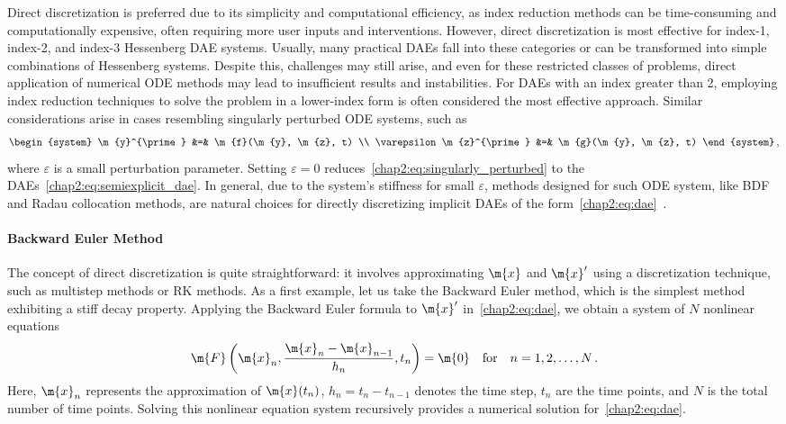 Direct discretization is preferred due to its simplicity and computational efficiency, as index reduction methods can be time-consuming and computationally expensive, often requiring more user inputs and interventions. However, direct discretization is most effective for index-1, index-2, and index-3 Hessenberg \ac{DAE} systems. Usually, many practical \acp{DAE} fall into these categories or can be transformed into simple combinations of Hessenberg systems. Despite this, challenges may still arise, and even for these restricted classes of problems, direct application of numerical \ac{ODE} methods may lead to insufficient results and instabilities. For \acp{DAE} with an index greater than 2, employing index reduction techniques to solve the problem in a lower-index form is often considered the most effective approach. Similar considerations arise in cases resembling singularly perturbed \ac{ODE} systems, such as
%
\begin{equation}
  \begin{system}
  \m{y}^{\prime}             &=& \m{f}(\m{y}, \m{z}, t) \\
  \varepsilon \m{z}^{\prime} &=& \m{g}(\m{y}, \m{z}, t)
  \end{system} \, \text{,}
  \label{chap2:eq:singularly_perturbed}
\end{equation}
%
where $\varepsilon$ is a small perturbation parameter. Setting $\varepsilon = 0$ reduces~\eqref{chap2:eq:singularly_perturbed} to the \acp{DAE}~\eqref{chap2:eq:semiexplicit_dae}. In general, due to the system's stiffness for small $\varepsilon$, methods designed for such \ac{ODE} system, like \ac{BDF} and Radau collocation methods, are natural choices for directly discretizing implicit \acp{DAE} of the form~\eqref{chap2:eq:dae}~\cite{martinvaquero2010radau}.

\paragraph{Backward Euler Method}

The concept of direct discretization is quite straightforward: it involves approximating $\m{x}$ and $\m{x}^{\prime}$ using a discretization technique, such as multistep methods or \ac{RK} methods. As a first example, let us take the Backward Euler method, which is the simplest method exhibiting a stiff decay property. Applying the Backward Euler formula to $\m{x}^{\prime}$ in~\eqref{chap2:eq:dae}, we obtain a system of $N$ nonlinear equations
%
\begin{equation}
  \m{F}\left(\m{x}_n, \dfrac{\m{x}_n - \m{x}_{n-1}}{h_n}, t_n\right) = \m{0} \quad \text{for} \quad n = 1, 2, \dots, N \, \text{.}
  \label{chap2:eq:backward_euler}
\end{equation}
%
Here, $\m{x}_n$ represents the approximation of $\m{x}(t_n)$, $h_n = t_n - t_{n-1}$ denotes the time step, $t_n$ are the time points, and $N$ is the total number of time points. Solving this nonlinear equation system recursively provides a numerical solution for~\eqref{chap2:eq:dae}.

